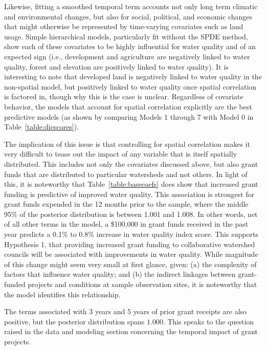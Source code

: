 \documentclass[12pt,a4paper,titlepage]{article}
\begin{document}




Likewise, fitting a smoothed temporal term accounts not only long term climatic and environmental changes, but also for social, political, and economic changes that might otherwise be represented by time-varying covariates such as land usage. Simple hierarchical models, particularly fit without the SPDE method, show each of these covariates to be highly influential for water quality and of an expected sign (i.e., development and agriculture are negatively linked to water quality, forest and elevation are positively linked to water quality). It is interesting to note that developed land is negatively linked to water quality in the non-spatial model, but positively linked to water quality once spatial correlation is factored in, though why this is the case is unclear. Regardless of covariate behavior, the models that account for spatial correlation explicitly are the best predictive models (as shown by comparing Models 1 through 7 with Model 0 in Table~\ref{table:dicscores}).



The implication of this issue is that controlling for spatial correlation makes it very difficult to tease out the impact of any variable that is itself spatially distributed. This includes not only the covariates discussed above, but also grant funds that are distributed to particular watersheds and not others. In light of this, it is noteworthy that Table~\ref{table:basecoefs} does show that increased grant funding is predictive of improved water quality. This association is strongest for grant funds expended in the 12 months prior to the sample, where the middle 95\% of the posterior distribution is between 1.001 and 1.008. In other words, net of all other terms in the model, a \$100,000 in grant funds received in the past year predicts a 0.1\% to 0.8\% increase in water quality index score. This supports Hypothesis 1, that providing increased grant funding to collaborative watershed councils will be associated with improvements in water quality. While magnitude of this change might seem very small at first glance, given: (a) the complexity of factors that influence water quality; and (b) the indirect linkages between grant-funded projects and conditions at sample observation sites, it is noteworthy that the model identifies this relationship.

The terms associated with 3 years and 5 years of prior grant receipts are also positive, but the posterior distribution spans $1.000$. This speaks to the question raised in the data and modeling section concerning the temporal impact of grant projects.
\end{document}

